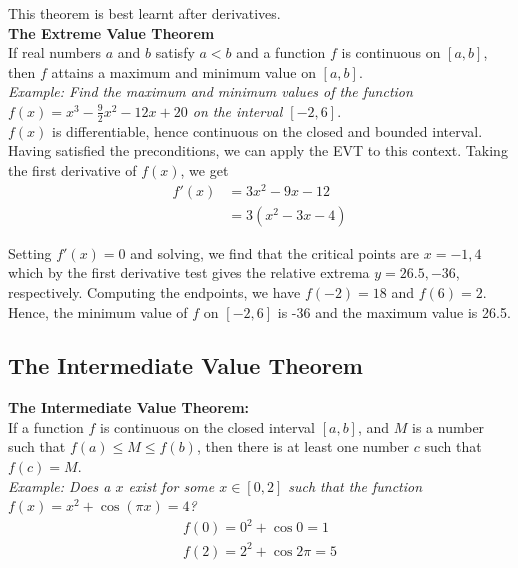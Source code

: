 \documentclass{article}
\begin{document}
            This theorem is best learnt after derivatives. \\
            \color{purple} \textbf{The Extreme Value Theorem} \color{black} \\
            If real numbers $a$ and $b$ satisfy $a<b$ and a function $f$ is continuous on $[a,b]$,
            then $f$ attains a maximum and minimum value on $[a,b]$. \\

            \noindent \color{blue} \textit{Example: Find the maximum and minimum values of the
            function $f(x)=x^3-\frac{9}{2}x^2-12x+20$ on the interval $[-2,6]$}. \color{black} \\
            $f(x)$ is differentiable, hence continuous on the closed and bounded interval. Having
            satisfied the preconditions, we can apply the EVT to this context. Taking the first
            derivative of $f(x)$, we get \\

            \begin{align*}
                f'(x) &= 3x^2 -9x -12 \\
                &= 3(x^2-3x-4)
            \end{align*}

            \noindent Setting $f'(x)=0$ and solving, we find that the critical points are $x=-1,4$
            which by the first derivative test gives the relative extrema $y=26.5,-36$, respectively.
            Computing the endpoints, we have $f(-2)=18$ and $f(6)=2$. Hence, the minimum value of $f$
            on $[-2,6]$ is -36 and the maximum value is 26.5.


        \subsection{The Intermediate Value Theorem}
            \color{purple} \textbf{The Intermediate Value Theorem:} \color{black} \\
            If a function $f$ is continuous on the closed interval $[a,b]$, and $M$ is a number such
            that $f(a)\leq M\leq f(b)$, then there is at least one number $c$ such that $f(c)=M$. \\

            \noindent \color{blue} \textit{Example: Does a $x$ exist for some $x\in[0,2]$ such that
            the function $f(x)=x^2+\cos{(\pi x)}=4$?} \color{black} \\

            \begin{align*}
                f(0) = 0^2 + \cos{0} = 1 \\
                f(2) = 2^2 + \cos{2\pi} = 5
            \end{align*}
\end{document}
